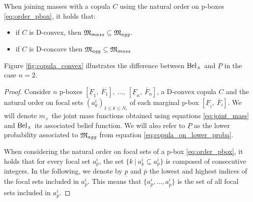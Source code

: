 \begin{proposition}\label{prop:convexity_pbox}
    When joining masses with a copula $C$ using the natural order on p-boxes \eqref{eq:order_pbox}, it holds that:
    \begin{itemize}
        \item if $C$ is D-convex, then ${\mathfrak{M}}_{mass}\subseteq {\mathfrak{M}}_{agg}$.
        \item if $C$ is D-concave then ${\mathfrak{M}}_{agg}\subseteq{\mathfrak{M}}_{mass}$ 
    \end{itemize}
\end{proposition}
Figure \ref{fig:copula_convex} illustrates the difference between ${\mathrm{Bel}}_\times$ and $\underline{P}$ in the case $n=2$.
\begin{proof}
    Consider $n$ p-boxes $[\underline{F}_1,~\overline{F}_1],~\dots,~[\underline{F}_n,~\overline{F}_n]$, a D-convex copula $C$ and the natural order on focal sets $(a^i_k)_{1\leqslant k \leqslant N_i}$ of each marginal p-box $[\underline{F}_i,~\overline{F}_i]$. We will denote $m_\times$ the joint mass functions obtained using equations \eqref{eq:joint_mass} and ${\mathrm{Bel}}_\times$ its associated belief function. We will also refer to $\underline{P}$ as the lower probability associated to ${\mathfrak{M}}_{agg}$ from equation \eqref{eq:copula_on_lower_proba}.

    When considering the natural order on focal sets of a p-box \eqref{eq:order_pbox}, it holds that for every focal set $a^i_p$, the set $\{k~|~a^i_k\subseteq a^i_p\}$ is composed of consecutive integers. In the following, we denote by $\underline{p}$ and $\overline{p}$ the lowest and highest indices of the focal sets included in $a^i_p$. This means that $\{a^i_{\underline{p}}, \dots, a^i_{\overline{p}}\}$ is the set of all focal sets included in $a^i_p$. 


\end{proof}
